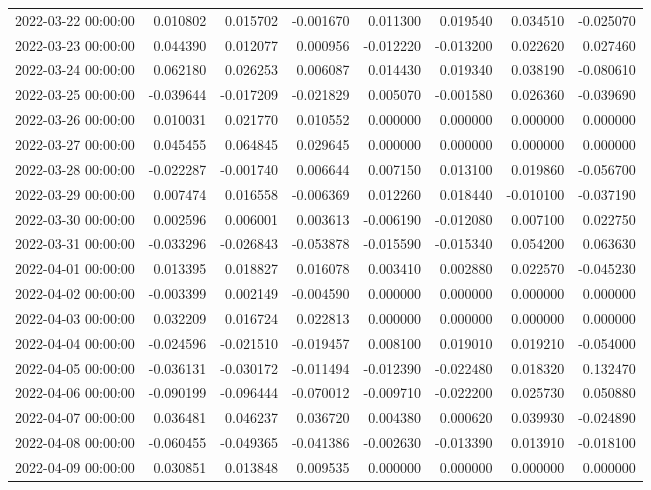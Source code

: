 \begin{tabular}{lrrrrrrr}
2022-03-22 00:00:00 & 0.010802 & 0.015702 & -0.001670 & 0.011300 & 0.019540 & 0.034510 & -0.025070 \\
2022-03-23 00:00:00 & 0.044390 & 0.012077 & 0.000956 & -0.012220 & -0.013200 & 0.022620 & 0.027460 \\
2022-03-24 00:00:00 & 0.062180 & 0.026253 & 0.006087 & 0.014430 & 0.019340 & 0.038190 & -0.080610 \\
2022-03-25 00:00:00 & -0.039644 & -0.017209 & -0.021829 & 0.005070 & -0.001580 & 0.026360 & -0.039690 \\
2022-03-26 00:00:00 & 0.010031 & 0.021770 & 0.010552 & 0.000000 & 0.000000 & 0.000000 & 0.000000 \\
2022-03-27 00:00:00 & 0.045455 & 0.064845 & 0.029645 & 0.000000 & 0.000000 & 0.000000 & 0.000000 \\
2022-03-28 00:00:00 & -0.022287 & -0.001740 & 0.006644 & 0.007150 & 0.013100 & 0.019860 & -0.056700 \\
2022-03-29 00:00:00 & 0.007474 & 0.016558 & -0.006369 & 0.012260 & 0.018440 & -0.010100 & -0.037190 \\
2022-03-30 00:00:00 & 0.002596 & 0.006001 & 0.003613 & -0.006190 & -0.012080 & 0.007100 & 0.022750 \\
2022-03-31 00:00:00 & -0.033296 & -0.026843 & -0.053878 & -0.015590 & -0.015340 & 0.054200 & 0.063630 \\
2022-04-01 00:00:00 & 0.013395 & 0.018827 & 0.016078 & 0.003410 & 0.002880 & 0.022570 & -0.045230 \\
2022-04-02 00:00:00 & -0.003399 & 0.002149 & -0.004590 & 0.000000 & 0.000000 & 0.000000 & 0.000000 \\
2022-04-03 00:00:00 & 0.032209 & 0.016724 & 0.022813 & 0.000000 & 0.000000 & 0.000000 & 0.000000 \\
2022-04-04 00:00:00 & -0.024596 & -0.021510 & -0.019457 & 0.008100 & 0.019010 & 0.019210 & -0.054000 \\
2022-04-05 00:00:00 & -0.036131 & -0.030172 & -0.011494 & -0.012390 & -0.022480 & 0.018320 & 0.132470 \\
2022-04-06 00:00:00 & -0.090199 & -0.096444 & -0.070012 & -0.009710 & -0.022200 & 0.025730 & 0.050880 \\
2022-04-07 00:00:00 & 0.036481 & 0.046237 & 0.036720 & 0.004380 & 0.000620 & 0.039930 & -0.024890 \\
2022-04-08 00:00:00 & -0.060455 & -0.049365 & -0.041386 & -0.002630 & -0.013390 & 0.013910 & -0.018100 \\
2022-04-09 00:00:00 & 0.030851 & 0.013848 & 0.009535 & 0.000000 & 0.000000 & 0.000000 & 0.000000 \\

\end{tabular}
